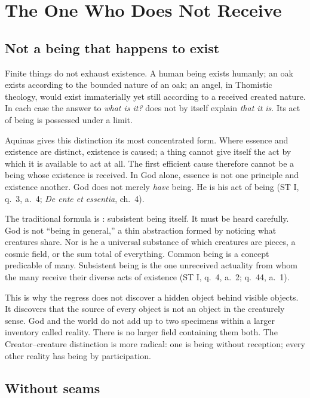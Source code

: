 \section{The One Who Does Not Receive}

\subsection{Not a being that happens to exist}

Finite things do not exhaust existence. A human being exists humanly; an oak exists according to the bounded nature of an oak; an angel, in Thomistic theology, would exist immaterially yet still according to a received created nature. In each case the answer to \emph{what is it?} does not by itself explain \emph{that it is}. Its act of being is possessed under a limit.

Aquinas gives this distinction its most concentrated form. Where essence and existence are distinct, existence is caused; a thing cannot give itself the act by which it is available to act at all. The first efficient cause therefore cannot be a being whose existence is received. In God alone, essence is not one principle and existence another. God does not merely \emph{have} being. He is his act of being (ST I, q.~3, a.~4; \emph{De ente et essentia}, ch.~4).

The traditional formula is : subsistent being itself. It must be heard carefully. God is not ``being in general,'' a thin abstraction formed by noticing what creatures share. Nor is he a universal substance of which creatures are pieces, a cosmic field, or the sum total of everything. Common being is a concept predicable of many. Subsistent being is the one unreceived actuality from whom the many receive their diverse acts of existence (ST I, q.~4, a.~2; q.~44, a.~1).

This is why the regress does not discover a hidden object behind visible objects. It discovers that the source of every object is not an object in the creaturely sense. God and the world do not add up to two specimens within a larger inventory called reality. There is no larger field containing them both. The Creator--creature distinction is more radical: one is being without reception; every other reality has being by participation.

\subsection{Without seams}

